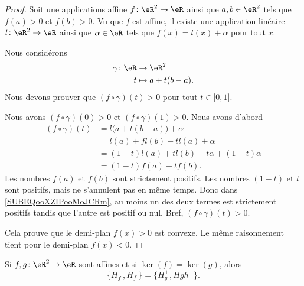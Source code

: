 \begin{proof}
    Soit une applications affine \( f\colon \eR^2\to\eR\) ainsi que \( a,b\in \eR^2\) tels que \( f(a)>0\) et \( f(b)>0\). Vu que \( f\) est affine, il existe une application linéaire \( l\colon \eR^2\to \eR\) ainsi que \( \alpha\in \eR\) tels que \( f(x)=l(x)+\alpha\) pour tout \( x\).
    
    Nous considérons
    \begin{equation}
        \begin{aligned}
            \gamma\colon \eR&\to \eR^2 \\
            t&\mapsto a+t(b-a). 
        \end{aligned}
    \end{equation}
    Nous devons prouver que \( (f\circ\gamma)(t)>0\) pour tout \( t\in\mathopen[ 0 , 1 \mathclose]\).

    Nous avons \( (f\circ\gamma)(0)>0\) et \( (f\circ\gamma)(1)>0\). Nous avons d'abord
    \begin{subequations}
        \begin{align}
            (f\circ\gamma)(t)&=l\big( a+t(b-a) \big)+\alpha\\
            &=l(a)+fl(b)-tl(a)+\alpha\\
            &=(1-t)l(a)+tl(b)+t\alpha+(1-t)\alpha\\
            &=(1-t)f(a)+tf(b).      \label{SUBEQooXZIPooMoJCRm}
        \end{align}
    \end{subequations}
    Les nombres \( f(a)\) et \( f(b)\) sont strictement positifs. Les nombres \( (1-t)\) et \( t\) sont positifs, mais ne s'annulent pas en même temps. Donc dans \eqref{SUBEQooXZIPooMoJCRm}, au moins un des deux termes est strictement positifs tandis que l'autre est positif ou nul. Bref, \( (f\circ\gamma)(t)>0\).

    Cela prouve que le demi-plan \( f(x)>0\) est convexe. Le même raisonnement tient pour le demi-plan \( f(x)<0\).
\end{proof}

\begin{lemma}
    Si \( f,g\colon \eR^2\to \eR\) sont affines et si \( \ker(f)=\ker(g)\), alors
    \begin{equation}
        \{H_f^+,H_f^-\}=\{ H_g^+,Hgh^- \}.
    \end{equation}
\end{lemma}

